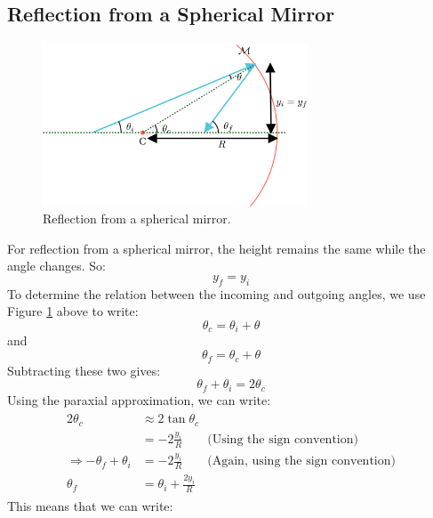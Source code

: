 \documentclass[12pt]{article}
\begin{document}
\subsection{Reflection from a Spherical Mirror}
\begin{figure}[h]
    \centering
    \includegraphics[width=0.7\textwidth]{images/reflection.png}
    \caption{Reflection from a spherical mirror.}
    \label{fig:reflection}
\end{figure}
For reflection from a spherical mirror, the height remains the same while the angle changes. So:
\begin{equation*}
    y_f = y_i
\end{equation*}
To determine the relation between the incoming and outgoing angles, we use Figure \ref{fig:reflection} above to write:
\begin{equation*}
    \theta_c = \theta_i + \theta
\end{equation*}
and
\begin{equation*}
    \theta_f = \theta_c + \theta
\end{equation*}
Subtracting these two gives:
\begin{equation}
    \label{eq:theta-f}
    \theta_f + \theta_i = 2\theta_c
\end{equation}
Using the paraxial approximation, we can write:
\begin{align}
    \begin{split}
        2\theta_c &\approx 2 \tan{\theta_c}\\
        & = -2\frac{y_i}{R} \quad \quad\text{(Using the sign convention)}\\
        \Rightarrow -\theta_f + \theta_i &= -2\frac{y_i}{R} \quad \quad\text{(Again, using the sign convention)}\\
        \theta_f &= \theta_i + \frac{2y_i}{R}
    \end{split}
\end{align}
This means that we can write:
\end{document}
